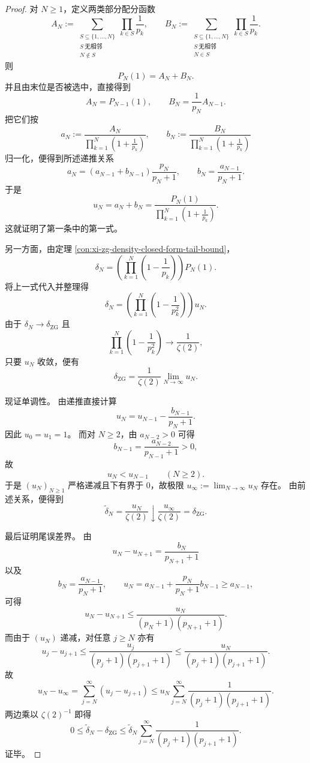 \begin{proof}
对 \(N\ge 1\)，定义两类部分配分函数
\[
A_N:=
\sum_{\substack{S\subseteq\{1,\dots,N\}\\ S\ \mathrm{无相邻}\\ N\notin S}}
\prod_{k\in S}\frac1{p_k},
\qquad
B_N:=
\sum_{\substack{S\subseteq\{1,\dots,N\}\\ S\ \mathrm{无相邻}\\ N\in S}}
\prod_{k\in S}\frac1{p_k}.
\]
则
\[
P_N(1)=A_N+B_N.
\]
并且由末位是否被选中，直接得到
\[
A_N=P_{N-1}(1),
\qquad
B_N=\frac{1}{p_N}A_{N-1}.
\]
把它们按
\[
a_N:=\frac{A_N}{\prod_{k=1}^{N}\left(1+\frac1{p_k}\right)},
\qquad
b_N:=\frac{B_N}{\prod_{k=1}^{N}\left(1+\frac1{p_k}\right)}
\]
归一化，便得到所述递推关系
\[
a_N=(a_{N-1}+b_{N-1})\frac{p_N}{p_N+1},
\qquad
b_N=\frac{a_{N-1}}{p_N+1}.
\]
于是
\[
u_N=a_N+b_N
=
\frac{P_N(1)}{\prod_{k=1}^{N}\left(1+\frac1{p_k}\right)}.
\]
这就证明了第一条中的第一式。

另一方面，由定理 \ref{con:xi-zg-density-closed-form-tail-bound}，
\[
\delta_N
=
\left(\prod_{k=1}^{N}\left(1-\frac1{p_k}\right)\right)P_N(1).
\]
将上一式代入并整理得
\[
\delta_N
=
\left(\prod_{k=1}^{N}\left(1-\frac1{p_k^2}\right)\right)u_N.
\]
由于 \(\delta_N\to \delta_{\mathrm{ZG}}\) 且
\[
\prod_{k=1}^{N}\left(1-\frac1{p_k^2}\right)\longrightarrow \frac1{\zeta(2)},
\]
只要 \(u_N\) 收敛，便有
\[
\delta_{\mathrm{ZG}}=\frac{1}{\zeta(2)}\lim_{N\to\infty}u_N.
\]

现证单调性。
由递推直接计算
\[
u_N
=
u_{N-1}-\frac{b_{N-1}}{p_N+1}.
\]
因此 \(u_0=u_1=1\)。
而对 \(N\ge 2\)，由 \(a_{N-2}>0\) 可得
\[
b_{N-1}=\frac{a_{N-2}}{p_{N-1}+1}>0,
\]
故
\[
u_N<u_{N-1}\qquad (N\ge 2).
\]
于是 \((u_N)_{N\ge 1}\) 严格递减且下有界于 \(0\)，故极限
\(
u_\infty:=\lim_{N\to\infty}u_N
\)
存在。
由前述关系，便得到
\[
\widetilde\delta_N=\frac{u_N}{\zeta(2)}\downarrow \frac{u_\infty}{\zeta(2)}=\delta_{\mathrm{ZG}}.
\]

最后证明尾误差界。
由
\[
u_N-u_{N+1}=\frac{b_N}{p_{N+1}+1}
\]
以及
\[
b_N=\frac{a_{N-1}}{p_N+1},
\qquad
u_N=a_{N-1}+\frac{p_N}{p_N+1}b_{N-1}\ge a_{N-1},
\]
可得
\[
u_N-u_{N+1}
\le
\frac{u_N}{(p_N+1)(p_{N+1}+1)}.
\]
而由于 \((u_N)\) 递减，对任意 \(j\ge N\) 亦有
\[
u_j-u_{j+1}
\le
\frac{u_j}{(p_j+1)(p_{j+1}+1)}
\le
\frac{u_N}{(p_j+1)(p_{j+1}+1)}.
\]
故
\[
u_N-u_\infty
=
\sum_{j=N}^{\infty}(u_j-u_{j+1})
\le
u_N\sum_{j=N}^{\infty}\frac{1}{(p_j+1)(p_{j+1}+1)}.
\]
两边乘以 \(\zeta(2)^{-1}\) 即得
\[
0\le \widetilde\delta_N-\delta_{\mathrm{ZG}}
\le
\widetilde\delta_N\sum_{j=N}^{\infty}\frac{1}{(p_j+1)(p_{j+1}+1)}.
\]
证毕。
\end{proof}
